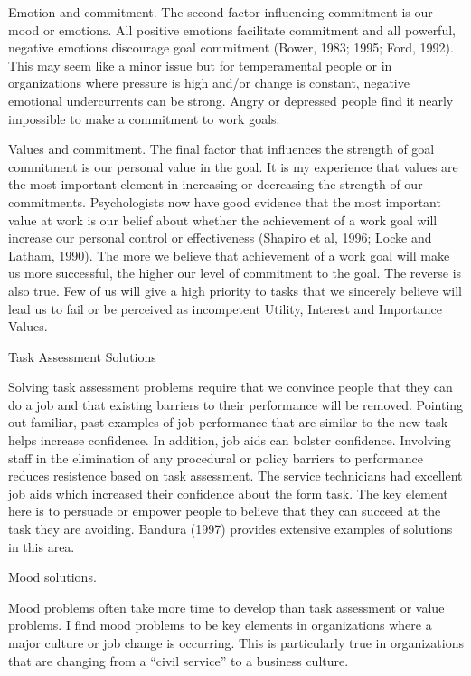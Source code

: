 Emotion and commitment. The second factor influencing commitment is our mood or emotions. All positive emotions facilitate commitment and all powerful, negative emotions discourage goal commitment (Bower, 1983; 1995; Ford, 1992). This may seem like a minor issue but for temperamental people or in organizations where pressure is high and/or change is constant, negative emotional undercurrents can be strong. Angry or depressed people find it nearly impossible to make a commitment to work goals.

Values and commitment. The final factor that influences the strength of goal commitment is our personal value in the goal. It is my experience that values are the most important element in increasing or decreasing the strength of our commitments. Psychologists now have good evidence that the most important value at work is our belief about whether the achievement of a work goal will increase our personal control or effectiveness (Shapiro et al, 1996; Locke and Latham, 1990). The more we believe that achievement of a work goal will make us more successful, the higher our level of commitment to the goal. The reverse is also true. Few of us will give a high priority to tasks that we sincerely believe will lead us to fail or be perceived as incompetent Utility, Interest and Importance Values.


Task Assessment Solutions

Solving task assessment problems require that we convince people that they can do a job and that existing barriers to their performance will be removed. Pointing out familiar, past examples of job performance that are similar to the new task helps increase confidence. In addition, job aids can bolster confidence. Involving staff in the elimination of any procedural or policy barriers to performance reduces resistence based on task assessment. The service technicians had excellent job aids which increased their confidence about the form task. The key element here is to persuade or empower people to believe that they can succeed at the task they are avoiding. Bandura (1997) provides extensive examples of solutions in this area.

Mood solutions.

Mood problems often take more time to develop than task assessment or value problems. I find mood problems to be key elements in organizations where a major culture or job change is occurring. This is particularly true in organizations that are changing from a “civil service” to a business culture.

